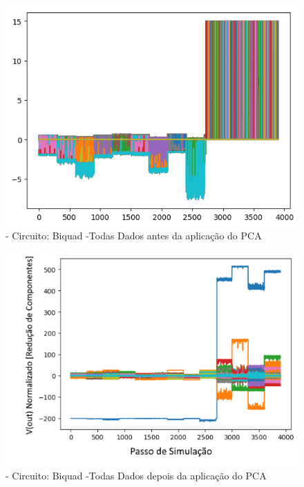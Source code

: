         \begin{figure}[H]
        \begin{center}
        \includegraphics[width=13cm]{./01_Pre_textuais/biquad_figs/PAA_Biquad_Highpass_Filter_mc_+_4bitPRBS_[FALHA]raw.png}
        \caption{\label{fig:paaSalenkey}- Circuito: Biquad -Todas Dados antes da aplicação do PCA}
        \end{center}
        \end{figure}
        
        
        \begin{figure}[H]
        \begin{center}
        \includegraphics[width=13cm]{./01_Pre_textuais/biquad_figs/PCA_Biquad_Highpass_Filter_mc_+_4bitPRBS_[FALHA]raw.png}
        \caption{\label{fig:pcaSalenkey}- Circuito: Biquad -Todas Dados depois da aplicação do PCA}
        \end{center}
        \end{figure}
        
